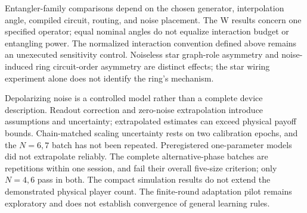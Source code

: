 Entangler-family comparisons depend on the chosen generator, interpolation
angle, compiled circuit, routing, and noise placement. The W results concern
one specified operator; equal nominal angles do not equalize interaction
budget or entangling power. The normalized interaction convention defined
above remains an unexecuted sensitivity control. Noiseless star graph-role
asymmetry and noise-induced ring circuit-order asymmetry are distinct effects;
the star wiring experiment alone does not identify the ring's mechanism.

Depolarizing noise is a controlled model rather than a complete device
description. Readout correction and zero-noise extrapolation introduce
assumptions and uncertainty; extrapolated estimates can exceed physical
payoff bounds. Chain-matched scaling uncertainty rests on two calibration
epochs, and the $N=6,7$ batch has not been repeated. Preregistered
one-parameter models did not extrapolate reliably. The complete
alternative-phase batches are repetitions within one session, and fail
their overall five-size criterion; only $N=4,6$ pass in both. The compact simulation
results do not extend the demonstrated physical player count. The
finite-round adaptation pilot remains exploratory and does not establish
convergence of general learning rules.
